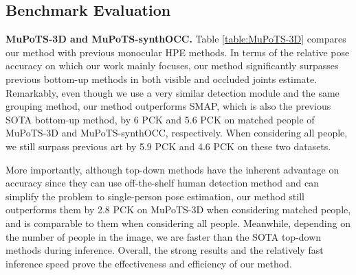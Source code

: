 \subsection{Benchmark Evaluation}
\label{sec:BenM-Eva}
\noindent\textbf{MuPoTS-3D and MuPoTS-synthOCC.}
Table \ref{table:MuPoTS-3D} compares our method with previous monocular HPE methods. In terms of the relative pose accuracy on which our work mainly focuses, our method significantly surpasses previous bottom-up methods in both visible and occluded joints estimate. Remarkably, even though we use a very similar detection module and the same grouping method, our method outperforms SMAP, which is also the previous SOTA bottom-up method, by 6 PCK and 5.6 PCK on matched people of MuPoTS-3D and MuPoTS-synthOCC, respectively. When considering all people, we still surpass previous art by 5.9 PCK and 4.6 PCK on these two datasets. 

More importantly, although top-down methods have the inherent advantage on accuracy since they can use off-the-shelf human detection method and can simplify the problem to single-person pose estimation, our method still outperforms them by 2.8 PCK on MuPoTS-3D when considering matched people, and is comparable to them when considering all people. Meanwhile, depending on the number of people in the image, we are faster than the SOTA top-down methods during inference. Overall, the strong results and the relatively fast inference speed prove the effectiveness and efficiency of our method.


